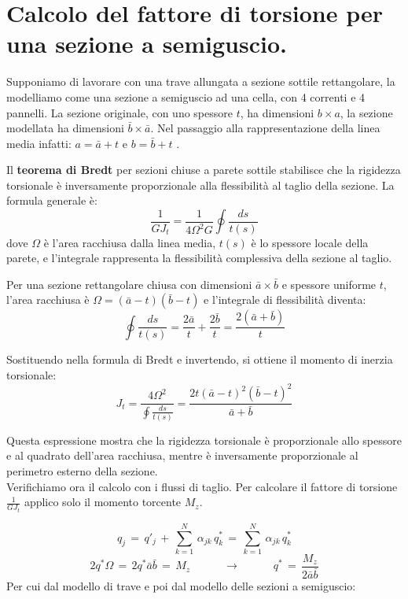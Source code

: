 \section{Calcolo del fattore di torsione per una sezione a semiguscio.}

Supponiamo di lavorare con una trave allungata a sezione sottile rettangolare, la modelliamo come una sezione a semiguscio ad una cella, con 4 correnti e 4 pannelli. La sezione originale, con uno spessore $t$, ha dimensioni $b\times a$, la sezione modellata ha dimensioni $\bar{b}\times\bar{a}$. Nel passaggio alla rappresentazione della linea media infatti: $a = \bar{a}+t$ e $b = \bar{b}+t$ .

Il \textbf{teorema di Bredt} per sezioni chiuse a parete sottile stabilisce che la rigidezza torsionale è inversamente proporzionale alla flessibilità al taglio della sezione. La formula generale è:
\begin{equation}
    \frac{1}{GJ_t} = \frac{1}{4\Omega^2 G} \oint \frac{ds}{t(s)}
\end{equation}
dove $\Omega$ è l'area racchiusa dalla linea media, $t(s)$ è lo spessore locale della parete, e l'integrale rappresenta la flessibilità complessiva della sezione al taglio.

Per una sezione rettangolare chiusa con dimensioni $\bar{a} \times \bar{b}$ e spessore uniforme $t$, l'area racchiusa è $\Omega = (\bar{a}-t)(\bar{b}-t)$ e l'integrale di flessibilità diventa:
\begin{equation}
    \oint \frac{ds}{t(s)} = \frac{2\bar{a}}{t} + \frac{2\bar{b}}{t} = \frac{2(\bar{a} + \bar{b})}{t}
\end{equation}

Sostituendo nella formula di Bredt e invertendo, si ottiene il momento di inerzia torsionale:
\begin{equation}
    J_t = \frac{4\Omega^2}{\oint \frac{ds}{t(s)}}  = \frac{2t(\bar{a}-t)^2(\bar{b}-t)^2}{\bar{a} + \bar{b}}
\end{equation}

Questa espressione mostra che la rigidezza torsionale è proporzionale allo spessore e al quadrato dell'area racchiusa, mentre è inversamente proporzionale al perimetro esterno della sezione.\\
Verifichiamo ora il calcolo con i flussi di taglio. Per calcolare il fattore di torsione $\frac{1}{GJ_t}$ applico solo il momento torcente $M_z$.

\begin{equation*}
    q_j\,=\,q'_j\,+\,   \sum^N_{k=1}\,\alpha_{jk}\,q^*_k\,=\,   \sum^N_{k=1}\,\alpha_{jk}\,q^*_k
\end{equation*}
\begin{equation*}
    2q^*\Omega \,=\,  2q^*\bar{a} \bar{b}\,=\, M_z\quad\quad\quad\rightarrow\quad\quad\quad q^*\,=\,\frac{M_z}{2\bar{a} \bar{b}}
\end{equation*}
Per cui dal modello di trave e poi dal modello delle sezioni a semiguscio:

